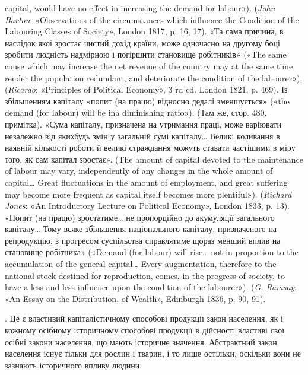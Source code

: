 {capital, would have no effect in increasing the demand for labour»). (\emph{John Barton}: «Observations of the circumstances which influence the Condition
of the Labouring Classes of Society», London 1817, p. 16, 17). «Та
сама причина, в наслідок якої зростає чистий дохід країни, може одночасно
на другому боці зробити людність надмірною і погіршити становище
робітників» («The same cause which may increase the net revenue of the country
may at the same time render the population redundant, and deteriorate
the condition of the labourer»). (\emph{Ricardo}: «Principles of Political Economy»,
3 rd cd. London 1821, p. 469). Із збільшенням капіталу «попит (на
працю) відносно дедалі зменшується» («the demand (for labour) will be ina diminishing
ratio»). (Там же, стор. 480, примітка). «Сума капіталу, призначена
на утримання праці, може варіювати незалежно від якихбудь змін
у загальній сумі капіталу\dots{} Великі коливання в наявній кількості роботи
й великі страждання можуть ставати частішими в міру того, як сам капітал
зростає». (The amount of capital devoted to the maintenance of labour
may vary, independently of any changes in the whole amount of capital\dots{}
Great fluctuations in the amount of employment, and great suffering may
become more frequent as capital itself becomes more plentiful»). (\emph{Richard Jones}: «An Introductory Lecture on Political Economy», London 1833, p. 13).
«Попит (на працю) зростатиме\dots{} не пропорційно до акумуляції загального
капіталу\dots{} Тому всяке збільшення національного капіталу, призначеного
на репродукцію, з прогресом суспільства справлятиме щораз
менший вплив на становище робітника» («Demand (for labour) will rise\dots{}
not in proportion to the accumulation of the general capital\dots{} Every
augmentation, therefore to the national stock destined for reproduction,
comes, in the progress of society, to have a less and less influence upon the
condition of the labourer»). (\emph{G. Ramsay}: «An Essay on the Distribution,
of Wealth», Edinburgh 1836, p. 90, 91).

}. Це є властивий капіталістичному
способові продукції закон населення, як і кожному осібному
історичному способові продукції в дійсності властиві свої осібні
закони населення, що мають історичне значення. Абстрактний
закон населення існує тільки для рослин і тварин, і то лише
остільки, оскільки вони не зазнають історичного впливу людини.


